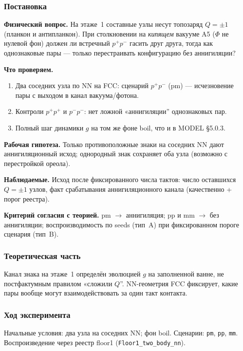\label{exp:cef01}

\subsubsection*{Постановка}
\textbf{Физический вопрос.}
На этаже~1 составные узлы несут топозаряд $Q=\pm1$ (планкон и антипланкон).
При столкновении на \emph{кипящем} вакууме A5 ($\Phi$ не нулевой фон) должен ли встречный $p^+p^-$ гасить друг друга, тогда как однознаковые пары --- только перестраивать конфигурацию без аннигиляции?

\textbf{Что проверяем.}
\begin{enumerate}[label=\textbf{(\alph*)},leftmargin=*,itemsep=0.25em]
\item Два соседних узла по NN на FCC: сценарий $p^+p^-$ (pm) --- исчезновение пары с выходом в канал вакуума/фотона.
\item Контроли $p^+p^+$ и $p^-p^-$: нет ложной «аннигиляции'' однознаковых пар.
\item Полный шаг динамики $g$ на том же фоне boil, что и в MODEL §5.0.3.
\end{enumerate}

\textbf{Рабочая гипотеза.}
Только противоположные знаки на соседних NN дают аннигиляционный исход; однородный знак сохраняет оба узла (возможно с перестройкой ореола).

\textbf{Наблюдаемые.}
Исход после фиксированного числа тактов: число оставшихся $Q=\pm1$ узлов, факт срабатывания аннигиляционного канала (качественно + порог реестра).

\textbf{Критерий согласия с теорией.}
pm $\to$ аннигиляция; pp и mm $\to$ без аннигиляции; воспроизводимость по seeds (тип~A) при фиксированном пороге сценария (тип~B).

\subsubsection*{Теоретическая часть}
Канал знака на этаже~1 определён эволюцией $g$ на заполненной ванне, не постфактумным правилом «сложили $Q$''.
NN-геометрия FCC фиксирует, какие пары вообще могут взаимодействовать за один такт контакта.

\subsubsection*{Ход эксперимента}
Начальные условия: два узла на соседних NN; фон boil.
Сценарии: \texttt{pm}, \texttt{pp}, \texttt{mm}.
Воспроизведение через реестр floor1 (\texttt{Floor1\_two\_body\_nn}).

